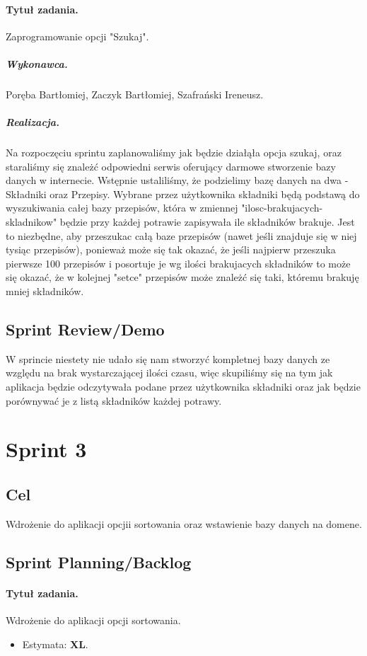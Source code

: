 \documentclass[a4paper]{article}
\begin{document}
	\paragraph{Tytuł zadania.} Zaprogramowanie opcji "Szukaj".
	\subparagraph{Wykonawca.} Poręba Bartłomiej, Zaczyk Bartłomiej, Szafrański Ireneusz.
	\subparagraph{Realizacja.}
	Na rozpoczęciu sprintu zaplanowaliśmy jak będzie działąła opcja szukaj, oraz staraliśmy się znależć odpowiedni serwis oferujący darmowe stworzenie bazy danych w internecie. Wstępnie ustaliliśmy, że podzielimy bazę danych na dwa - Składniki oraz Przepisy. Wybrane przez użytkownika składniki będą podstawą do wyszukiwania całej bazy przepisów, która w zmiennej "ilosc-brakujacych-skladnikow" będzie przy każdej potrawie zapisywała ile składników brakuje. Jest to niezbędne, aby przeszukac całą baze przepisów (nawet jeśli znajduje się w niej tysiąc przepisów), ponieważ może się tak okazać, że jeśli najpierw przeszuka pierwsze 100 przepisów i posortuje je wg ilości brakujacych składników to może się okazać, że w kolejnej "setce" przepisów może znależć się taki, któremu brakuję mniej składników.
	
	
	
	\subsection{Sprint Review/Demo}
W sprincie niestety nie udało się nam stworzyć kompletnej bazy danych ze względu na brak wystarczającej ilości czasu, więc skupiliśmy się na tym jak aplikacja będzie odczytywała podane przez użytkownika składniki oraz jak będzie porównywać je z listą składników każdej potrawy.
	
	
	\section{Sprint 3}
	
	\subsection{Cel} Wdrożenie do aplikacji opcjii sortowania oraz wstawienie bazy danych na domene.
	
	\subsection{Sprint Planning/Backlog}
	
	\paragraph{Tytuł zadania.} Wdrożenie do aplikacji opcji sortowania.
	\begin{itemize}
		\item Estymata: \textbf{XL}.
	\end{itemize}
\end{document}
